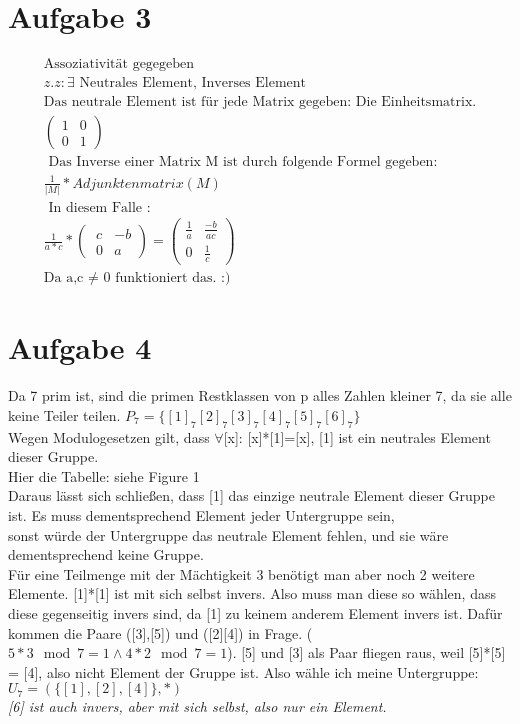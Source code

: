 \documentclass[]{article}
\begin{document}
\section{Aufgabe 3}
\begin{gather*}
\text {Assoziativität gegegeben}\\
z.z: \exists \text{ Neutrales Element, Inverses Element }\\
		\text{Das neutrale Element ist für jede Matrix gegeben: Die Einheitsmatrix.}\\
	 \left( \begin{matrix}
		1 & 0 \\ 
		0 & 1
		\end{matrix} \right) \\
	\text{	Das Inverse einer Matrix M  ist durch folgende Formel gegeben: }\\
	\frac{1}{|M|}*Adjunktenmatrix(M)\\
	\text{ In diesem Falle :}\\
	\frac{1}{a*c} * \left(\ \begin{matrix}
	c & -b \\ 
	0 & a
	\end{matrix} \right) = \left(\begin{array}{cc}
	\frac{1}{a} & \frac{-b}{ac} \\ 
	0 & \frac{1}{c}
	\end{array} \right) \\
		\text{Da a,c $\neq$ 0 funktioniert das. :)}
\end{gather*}
\newpage
\section{Aufgabe 4}
Da 7 prim ist, sind die primen Restklassen von p alles Zahlen kleiner 7, da sie alle keine Teiler teilen.
$P_7 =\{[1]_7[2]_7[3]_7[4]_7[5]_7[6]_7\}$ \\
Wegen Modulogesetzen gilt, dass $\forall$[x]:  [x]*[1]=[x], [1] ist ein neutrales Element dieser Gruppe. \\ 
Hier die Tabelle: siehe Figure 1 \\ Daraus lässt sich schließen, dass [1] das einzige neutrale Element dieser Gruppe ist. Es muss dementsprechend Element jeder Untergruppe sein,\\ sonst würde der Untergruppe das neutrale Element fehlen, und sie wäre dementsprechend keine Gruppe.\\
Für eine Teilmenge mit der Mächtigkeit 3 benötigt man aber noch 2 weitere Elemente. [1]*[1] ist mit sich selbst invers. Also muss man diese so wählen, dass diese gegenseitig invers sind, da [1] zu keinem anderem Element invers ist. Dafür kommen die Paare ([3],[5]) und ([2][4]) in Frage. ($5*3 \mod 7 = 1 \land 4*2 \mod 7 = 1 $). [5] und [3] als Paar fliegen raus, weil [5]*[5] = [4], also nicht Element der Gruppe ist.  
Also wähle ich meine Untergruppe:\\ $U_7 = (\{ [1],[2],[4] \}, *) $ \\
\textit{[6] ist auch invers, aber mit sich selbst, also nur ein Element. }
\end{document}
